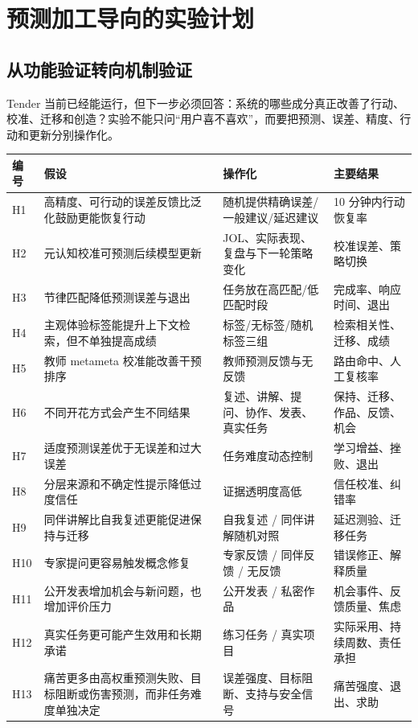 \documentclass[UTF8,a4paper,11pt]{ctexart}
\begin{document}
\newpage
\section{预测加工导向的实验计划}

\subsection{从功能验证转向机制验证}

Tender 当前已经能运行，但下一步必须回答：系统的哪些成分真正改善了行动、校准、迁移和创造？实验不能只问“用户喜不喜欢”，而要把预测、误差、精度、行动和更新分别操作化。

\begin{center}
\begin{longtable}{@{}p{1.4cm}p{4.5cm}p{5.2cm}p{3.4cm}@{}}
\toprule
\textbf{编号} & \textbf{假设} & \textbf{操作化} & \textbf{主要结果} \\
\midrule
H1 & 高精度、可行动的误差反馈比泛化鼓励更能恢复行动 & 随机提供精确误差/一般建议/延迟建议 & 10 分钟内行动恢复率 \\
H2 & 元认知校准可预测后续模型更新 & JOL、实际表现、复盘与下一轮策略变化 & 校准误差、策略切换 \\
H3 & 节律匹配降低预测误差与退出 & 任务放在高匹配/低匹配时段 & 完成率、响应时间、退出 \\
H4 & 主观体验标签能提升上下文检索，但不单独提高成绩 & 标签/无标签/随机标签三组 & 检索相关性、迁移、成绩 \\
H5 & 教师 metameta 校准能改善干预排序 & 教师预测反馈与无反馈 & 路由命中、人工复核率 \\
H6 & 不同开花方式会产生不同结果 & 复述、讲解、提问、协作、发表、真实任务 & 保持、迁移、作品、反馈、机会 \\
H7 & 适度预测误差优于无误差和过大误差 & 任务难度动态控制 & 学习增益、挫败、退出 \\
H8 & 分层来源和不确定性提示降低过度信任 & 证据透明度高低 & 信任校准、纠错率 \\
H9 & 同伴讲解比自我复述更能促进保持与迁移 & 自我复述 / 同伴讲解随机对照 & 延迟测验、迁移任务 \\
H10 & 专家提问更容易触发概念修复 & 专家反馈 / 同伴反馈 / 无反馈 & 错误修正、解释质量 \\
H11 & 公开发表增加机会与新问题，也增加评价压力 & 公开发表 / 私密作品 & 机会事件、反馈质量、焦虑 \\
H12 & 真实任务更可能产生效用和长期承诺 & 练习任务 / 真实项目 & 实际采用、持续周数、责任承担 \\
H13 & 痛苦更多由高权重预测失败、目标阻断或伤害预测，而非任务难度单独决定 & 误差强度、目标阻断、支持与安全信号 & 痛苦强度、退出、求助 \\

\end{longtable}
\end{center}
\end{document}
